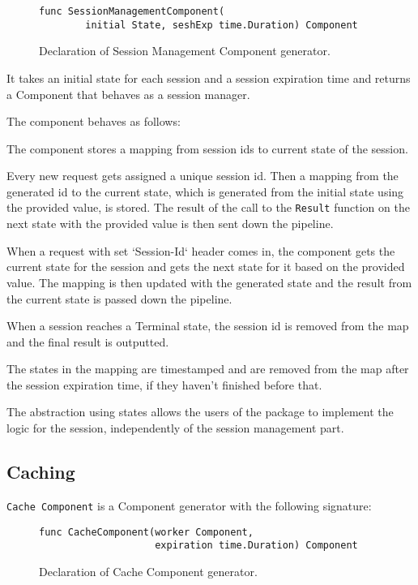\documentclass[12pt,a4paper]{article}
\begin{document}
\begin{figure}[h]
\centering
\begin{lstlisting}
func SessionManagementComponent(
		initial State, seshExp time.Duration) Component
\end{lstlisting}
\caption[scale=1.0]{Declaration of Session Management Component generator.}
\label{fig:seshComp}
\end{figure}

It takes an initial state for each session and a session expiration time and 
returns a Component that behaves as a session manager. 

The component behaves as follows:

The component stores a mapping from session ids to current state of the session.

Every new request gets assigned a unique session id. Then a mapping from the generated 
id to the current state, which is generated from the initial state using the provided value,
is stored. The result of the call to the \texttt{Result} function on the next state with the provided 
value is then sent down the pipeline.

When a request with set `Session-Id` header comes in, the component gets the current 
state for the session and gets the next state for it based on the provided value.
The mapping is then updated with the generated state and the result from the current state
is passed down the pipeline.

When a session reaches a Terminal state, the session id is removed from the map
and the final result is outputted.

The states in the mapping are timestamped and are removed from the map after
the session expiration time, if they haven't finished before that.

The abstraction using states allows the users of the package to implement the
logic for the session, independently of the session management part.

\subsection{Caching}
\texttt{Cache Component} is a Component generator with the following signature:

\begin{figure}[h]
\centering
\begin{lstlisting}
func CacheComponent(worker Component, 
					expiration time.Duration) Component
\end{lstlisting}
\caption[scale=1.0]{Declaration of Cache Component generator.}
\label{fig:cacheComp}
\end{figure}
\end{document}
